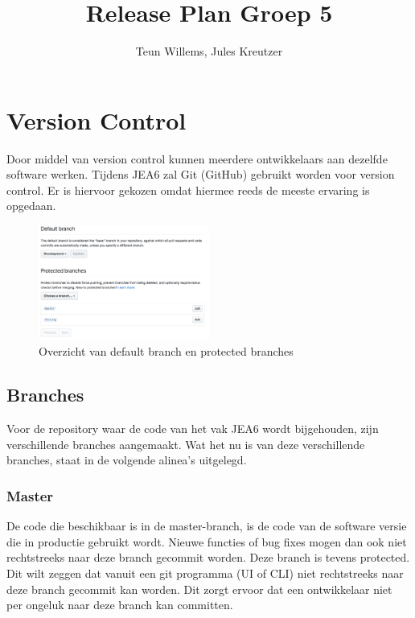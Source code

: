 \documentclass{article}
\title{Release Plan Groep 5}
\author{Teun Willems, Jules Kreutzer}
\begin{document}
	\maketitle
	
	\newpage
	
	\section{Version Control}
	Door middel van version control kunnen meerdere ontwikkelaars aan dezelfde software werken.
	Tijdens JEA6 zal Git (GitHub) gebruikt worden voor version control. Er is hiervoor gekozen omdat hiermee reeds de meeste ervaring is opgedaan.
	
	\begin{figure}[H]
			\includegraphics[width=0.50\textwidth]{images/configuredBranches.png}
			\caption{Overzicht van default branch en protected branches}
			\label{fig:ConfiguredBranches}
	\end{figure}
	
	\subsection{Branches}
	Voor de repository waar de code van het vak JEA6 wordt bijgehouden, zijn verschillende branches aangemaakt. Wat het nu is van deze verschillende branches, staat in de volgende alinea's uitgelegd.
	
	\subsubsection{Master}
	De code die beschikbaar is in de master-branch, is de code van de software versie die in productie gebruikt wordt. Nieuwe functies of bug fixes mogen dan ook niet rechtstreeks naar deze branch gecommit worden.
	Deze branch is tevens protected. Dit wilt zeggen dat vanuit een git programma (UI of CLI) niet rechtstreeks naar deze branch gecommit kan worden. Dit zorgt ervoor dat een ontwikkelaar niet per ongeluk naar deze branch kan committen.
	
\end{document}
